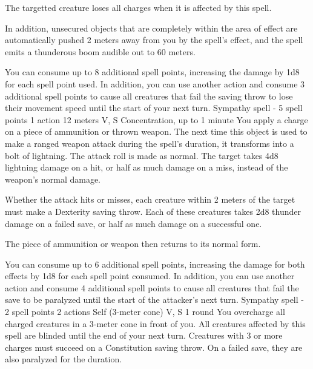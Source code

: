         The targetted creature loses all charges when it is affected by this spell.

        In addition, unsecured objects that are completely within the area of effect are automatically pushed 2 meters away from you by the spell's effect, and the spell emits a thunderous boom audible out to 60 meters.

        You can consume up to 8 additional spell points, increasing the damage by 1d8 for each spell point used.
        In addition, you can use another action and consume 3 additional spell points to cause all creatures that fail the saving throw to lose their movement speed until the start of your next turn.
        {Sympathy spell - 5 spell points}
        {1 action}
        {12 meters}
        {V, S}
        {Concentration, up to 1 minute}
        You apply a charge on a piece of ammunition or thrown weapon.
        The next time this object is used to make a ranged weapon attack during the spell's duration, it transforms into a bolt of lightning.
        The attack roll is made as normal.
        The target takes 4d8 lightning damage on a hit, or half as much damage on a miss, instead of the weapon's normal damage.

        Whether the attack hits or misses, each creature within 2 meters of the target must make a Dexterity saving throw.
        Each of these creatures takes 2d8 thunder damage on a failed save, or half as much damage on a successful one.

        The piece of ammunition or weapon then returns to its normal form.

        You can consume up to 6 additional spell points, increasing the damage for both effects by 1d8 for each spell point consumed.
        In addition, you can use another action and consume 4 additional spell points to cause all creatures that fail the save to be paralyzed until the start of the attacker's next turn.
        {Sympathy spell - 2 spell points}
        {2 actions}
        {Self (3-meter cone)}
        {V, S}
        {1 round}
        You overcharge all charged creatures in a 3-meter cone in front of you.
        All creatures affected by this spell are blinded until the end of your next turn.
        Creatures with 3 or more charges must succeed on a Constitution saving throw.
        On a failed save, they are also paralyzed for the duration.

